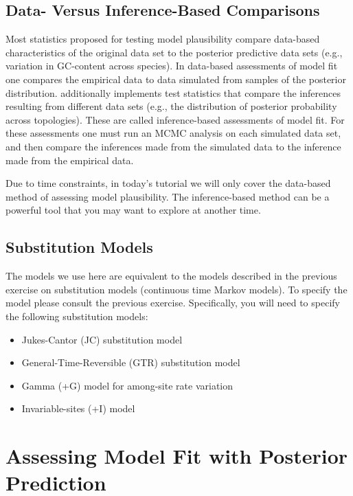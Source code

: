 \subsection{Data- Versus Inference-Based Comparisons}

Most statistics proposed for testing model plausibility compare data-based characteristics of the original data set to the posterior
    predictive data sets (e.g., variation in GC-content across species).
    In data-based assessments of model fit one compares the empirical data to data simulated from samples of the posterior distribution.
    \RevBayes additionally implements test statistics that compare the inferences
        resulting from different data sets (e.g., the distribution of posterior probability across topologies).
        These are called inference-based assessments of model fit. For these assessments one must run an MCMC analysis
        on each simulated data set, and then compare the inferences made from the simulated data to the inference made from the empirical data.

Due to time constraints, in today's tutorial we will only cover the data-based method of assessing model plausibility. 
The inference-based method can be a powerful tool that you may want to explore at another time.

\bigskip
\subsection{Substitution Models}\label{secUnif} 

The models we use here are equivalent to the models described in the previous exercise on substitution models (continuous time Markov models).
To specify the model please consult the previous exercise. Specifically, you will need to specify the following substitution models:
\begin{itemize}
\item Jukes-Cantor (JC) substitution model \citep{Jukes1969-jp}
\item General-Time-Reversible (GTR) substitution model \citep{Tavare1986-ij}
\item Gamma (+G) model for among-site rate variation \citep{Yang1994-ep}
\item Invariable-sites (+I) model \citep{Hasegawa1985-ir}
\end{itemize}


\bigskip
\section{Assessing Model Fit with Posterior Prediction}

